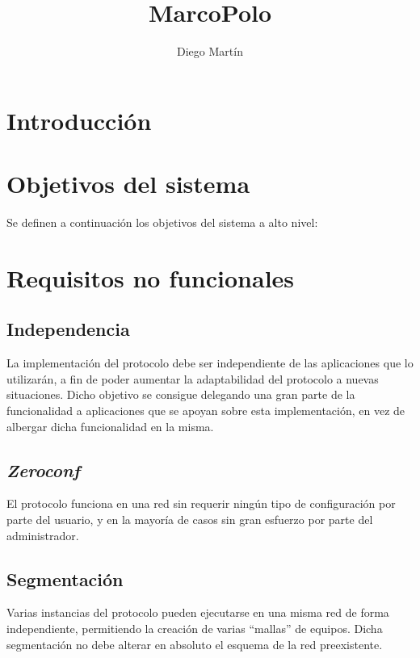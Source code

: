 \documentclass{article}
\begin{document}
\title{MarcoPolo}
\author{Diego Martín}
\maketitle

\section{Introducción}

\section{Objetivos del sistema}

Se definen a continuación los objetivos del sistema a alto nivel:

\section{Requisitos no funcionales}

\subsection{Independencia}

La implementación del protocolo debe ser independiente de las aplicaciones que lo utilizarán, a fin de poder aumentar la adaptabilidad del protocolo a nuevas situaciones. Dicho objetivo se consigue delegando una gran parte de la funcionalidad a aplicaciones que se apoyan sobre esta implementación, en vez de albergar dicha funcionalidad en la misma.

\subsection{\textit{Zeroconf}}

El protocolo funciona en una red sin requerir ningún tipo de configuración por parte del usuario, y en la mayoría de casos sin gran esfuerzo por parte del administrador.

\subsection{Segmentación}

Varias instancias del protocolo pueden ejecutarse en una misma red de forma independiente, permitiendo la creación de varias ``mallas'' de equipos. Dicha segmentación no debe alterar en absoluto el esquema de la red preexistente.
\end{document}
